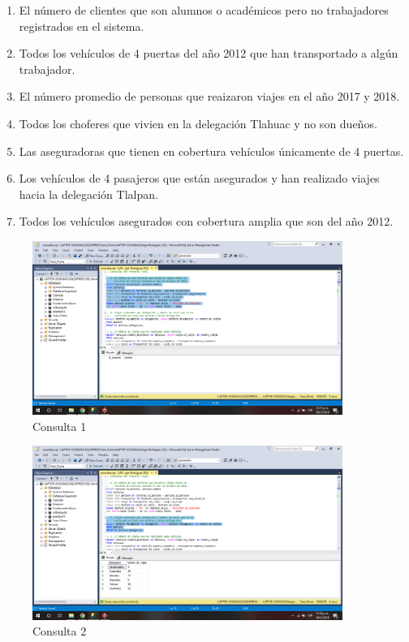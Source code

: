 \documentclass{article}
\begin{document}
\begin{enumerate}
    \item El número de clientes que son alumnos o académicos pero no trabajadores registrados en el sistema.
    
    \item Todos los vehículos de 4 puertas del año 2012 que han transportado a algún trabajador.
    
    \item El número promedio de personas que reaizaron viajes en el año 2017 y 2018.
    
    \item Todos los choferes que vivien en la delegación Tlahuac y no son dueños.
    
    \item Las aseguradoras que tienen en cobertura vehículos únicamente de 4 puertas.
    
    \item Los vehículos de 4 pasajeros que están asegurados y han realizado viajes hacia la delegación Tlalpan.
    
    \item Todos los vehículos asegurados con cobertura amplia que son del año 2012.
    
\end{enumerate}

\begin{figure}[h]
            \centering
            \includegraphics[width=0.9\textwidth]{img/53.png}
            \caption{Consulta 1}
            \label{fig:my_label1}
        \end{figure}
        
\begin{figure}[h]
            \centering
            \includegraphics[width=0.9\textwidth]{img/54.png}
            \caption{Consulta 2}
            \label{fig:my_label2}
        \end{figure}
\end{document}
